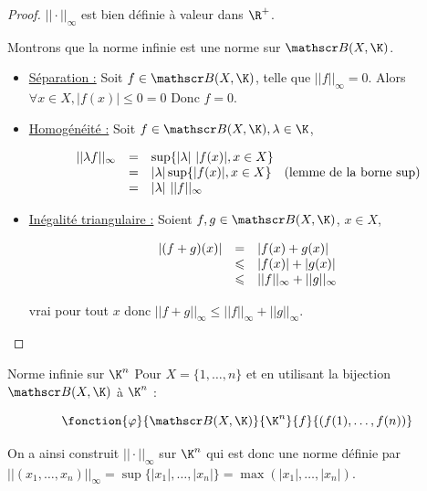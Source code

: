 \begin{proof}
    $|| \cdot ||_\infty$ est bien définie à valeur dans $\R^+$.

    Montrons que la norme infinie est une norme sur $\mathscr B (X, \K)$. 

    \begin{itemize}
        \item \uline{Séparation :}
        Soit $f \in \mathscr B(X, \K)$, telle que $||f ||_\infty = 0$. 
        Alors $\forall x \in X, |f(x)| \leqslant 0 = 0$
        Donc $f = 0$.

        \item \uline{Homogénéité :} Soit $f \in \mathscr B(X, \K), \lambda \in \K$,

        \[
        \begin{array}{rcl}
            || \lambda f ||_\infty & = & \sup\{|\lambda|~|f(x)|, x \in X\} \\
            \space & = & |\lambda| \sup \{ |f(x)| , x \in X\} \quad \text{(lemme de la borne sup)}\\
            \space & = & |\lambda| ~ ||f ||_\infty \\
        \end{array}
        \]

        \item \uline{Inégalité triangulaire :} Soient $f, g \in \mathscr B(X, \K)$, $x \in X$, 

        \[
        \begin{array}{rcl}
            |(f + g)(x)| & = & |f(x) + g(x)| \\
            \space & \leqslant & |f(x)| + |g(x)| \\
            \space & \leqslant & ||f||_\infty + ||g ||_\infty \\
        \end{array}
        \]

        vrai pour tout $x$ donc $|| f + g||_\infty \leqslant ||f||_\infty + ||g||_\infty$.
    \end{itemize}
\end{proof}

\begin{definition}{Norme infinie sur $\K^n$}{}
    Pour $X = \{1, \dots, n\}$ et en utilisant la bijection $\mathscr B(X, \K)$
    à $\K^n$ :

    \[\fonction{\varphi}{\mathscr B(X, \K)}{\K^n}{f}{(f(1), \dots, f(n))}\]

    On a ainsi construit $|| \cdot ||_\infty$ sur $\K^n$ qui est donc une norme définie
    par $||(x_1, \dots, x_n)||_\infty = \sup\{|x_1|, \dots, |x_n| \} = \max (|x_1|, \dots, |x_n|)$.
\end{definition}

